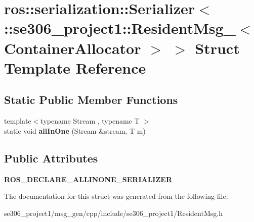 \hypertarget{structros_1_1serialization_1_1Serializer_3_01_1_1se306__project1_1_1ResidentMsg___3_01ContainerAllocator_01_4_01_4}{\section{ros\-:\-:serialization\-:\-:Serializer$<$ \-:\-:se306\-\_\-project1\-:\-:Resident\-Msg\-\_\-$<$ Container\-Allocator $>$ $>$ Struct Template Reference}
\label{structros_1_1serialization_1_1Serializer_3_01_1_1se306__project1_1_1ResidentMsg___3_01ContainerAllocator_01_4_01_4}
}
\subsection*{Static Public Member Functions}
\begin{DoxyCompactItemize}
\item 
\hypertarget{structros_1_1serialization_1_1Serializer_3_01_1_1se306__project1_1_1ResidentMsg___3_01ContainerAllocator_01_4_01_4_ad3478d0ec2e0f6c8818c4435fdedf979}{{\footnotesize template$<$typename Stream , typename T $>$ }\\static void {\bfseries all\-In\-One} (Stream \&stream, T m)}\label{structros_1_1serialization_1_1Serializer_3_01_1_1se306__project1_1_1ResidentMsg___3_01ContainerAllocator_01_4_01_4_ad3478d0ec2e0f6c8818c4435fdedf979}

\end{DoxyCompactItemize}
\subsection*{Public Attributes}
\begin{DoxyCompactItemize}
\item 
\hypertarget{structros_1_1serialization_1_1Serializer_3_01_1_1se306__project1_1_1ResidentMsg___3_01ContainerAllocator_01_4_01_4_a831a379812e81672e65c4689dc390c88}{{\bfseries R\-O\-S\-\_\-\-D\-E\-C\-L\-A\-R\-E\-\_\-\-A\-L\-L\-I\-N\-O\-N\-E\-\_\-\-S\-E\-R\-I\-A\-L\-I\-Z\-E\-R}}\label{structros_1_1serialization_1_1Serializer_3_01_1_1se306__project1_1_1ResidentMsg___3_01ContainerAllocator_01_4_01_4_a831a379812e81672e65c4689dc390c88}

\end{DoxyCompactItemize}


The documentation for this struct was generated from the following file\-:\begin{DoxyCompactItemize}
\item 
se306\-\_\-project1/msg\-\_\-gen/cpp/include/se306\-\_\-project1/Resident\-Msg.\-h\end{DoxyCompactItemize}
